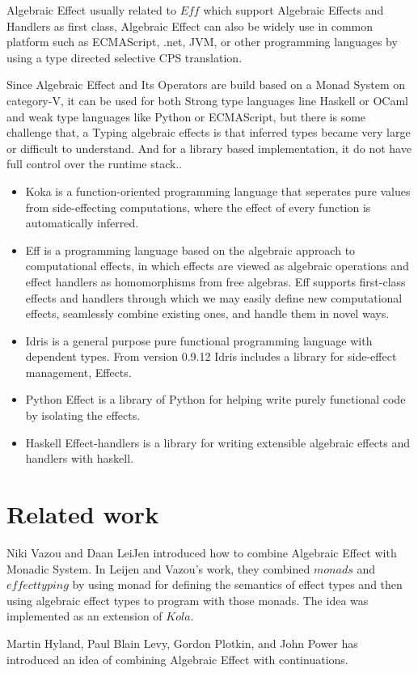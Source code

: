 \documentclass[twocolumn]{article}
\begin{document}
Algebraic Effect usually related to $Eff$ which support Algebraic Effects and Handlers as first class,    Algebraic Effect can also be widely use in common platform such as ECMAScript, .net, JVM, or other programming languages by using a type directed selective CPS translation\cite{algebraic-effects-for-functional-programming}.

Since Algebraic Effect and Its Operators are build based on a Monad System on category-V, it can be used for both Strong type languages line Haskell or OCaml and weak type languages like Python or ECMAScript, but there is some challenge that, a Typing algebraic effects is that inferred types became very large or difficult to understand. And for a library based implementation, it do not have full control over the runtime stack.\cite{algebraic-effects-for-functional-programming}.

\begin{itemize}
\item Koka is a function-oriented programming language that seperates pure values from side-effecting computations, where the effect of every function is automatically inferred.

\item Eff is a programming language based on the algebraic approach to computational effects, in which effects are viewed as algebraic operations and effect handlers as homomorphisms from free algebras.\cite{eff} Eff supports ﬁrst-class effects and handlers through which we may easily deﬁne new computational effects, seamlessly combine existing ones, and handle them in novel ways.

\item Idris is a general purpose pure functional programming language with dependent types. From version 0.9.12 Idris includes a library for side-effect management, Effects.


\item Python Effect is a library of Python for helping write purely functional code by isolating the effects\cite{python-effect}.

\item Haskell Effect-handlers is a library for writing extensible algebraic effects and handlers with haskell\cite{effect-handlers}.
\end{itemize}

\section{Related work}

Niki Vazou and Daan LeiJen introduced how to combine Algebraic Effect with Monadic  System\cite{10.1007/978-3-319-28228-2_11}. In Leijen and Vazou's work, they combined $monads$ and $effect typing$ by using monad for defining the semantics of effect types and then using algebraic effect types to program with those monads. The idea was implemented as an extension of $Kola$.

Martin Hyland, Paul Blain Levy, Gordon Plotkin, and John Power has introduced an idea of combining Algebraic Effect with continuations\cite{HYLAND200720}.

{}
\end{document}
